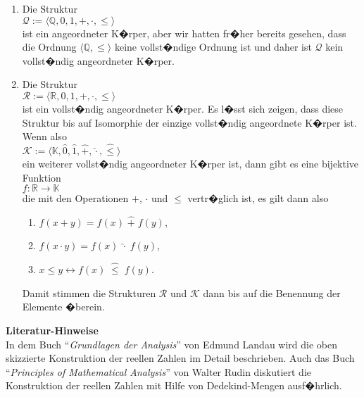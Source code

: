 \examples
\begin{enumerate}
\item Die Struktur
      \\[0.2cm]
      \hspace*{1.3cm}
      $\mathcal{Q} := \langle \mathbb{Q}, 0, 1, +, \cdot, \leq \rangle$ 
      \\[0.2cm]
      ist ein angeordneter K�rper,  aber wir hatten fr�her bereits gesehen, dass die Ordnung $\langle \mathbb{Q}, \leq \rangle$
      keine vollst�ndige Ordnung ist und daher ist $\mathcal{Q}$ kein vollst�ndig angeordneter K�rper.
\item Die Struktur 
      \\[0.2cm]
      \hspace*{1.3cm}
      $\mathcal{R} := \langle \mathbb{R}, 0, 1, +, \cdot, \leq \rangle$ 
      \\[0.2cm]
      ist ein vollst�ndig angeordneter K�rper.  Es l�sst sich zeigen, dass diese Struktur bis auf
      Isomorphie der einzige vollst�ndig angeordnete K�rper ist.  Wenn also
      \\[0.2cm]
      \hspace*{1.3cm}
      $\mathcal{K} := \langle \mathbb{K}, \widehat{0}, \widehat{1}, \widehat{+}, \hat{\cdot}, \widehat{\leq} \rangle$ 
      \\[0.2cm]
      ein weiterer vollst�ndig angeordneter K�rper ist, dann gibt es eine bijektive Funktion
      \\[0.2cm]
      \hspace*{1.3cm}
      $f: \mathbb{R} \rightarrow \mathbb{K}$
      \\[0.2cm]
      die mit den Operationen $+$, $\cdot$ und $\leq$ vertr�glich ist, es gilt dann also
      \begin{enumerate}
      \item $f(x + y) = f(x) \;\widehat{+}\; f(y)$,
      \item $f(x \cdot y) = f(x) \;\hat{\cdot}\; f(y)$,
      \item $x \leq y  \leftrightarrow f(x) \;\widehat{\leq}\; f(y)$.
      \end{enumerate}
      Damit stimmen die Strukturen $\mathcal{R}$ und $\mathcal{K}$ dann bis auf die Benennung der
      Elemente �berein. \eox
\end{enumerate}

\noindent
\textbf{Literatur-Hinweise} \\
In dem Buch ``\emph{Grundlagen der Analysis}'' von Edmund Landau \cite{landau:1930} wird die oben skizzierte
Konstruktion der reellen Zahlen im Detail beschrieben.   Auch das Buch ``\emph{Principles of
  Mathematical Analysis}'' von Walter Rudin \cite{rudin:1976} diskutiert die Konstruktion der reellen
Zahlen mit Hilfe von Dedekind-Mengen ausf�hrlich. 





